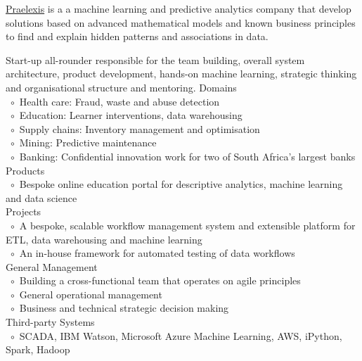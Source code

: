 \documentclass[10pt,a4paper,final]{columncv}
\newcommand{\cvitembullet}{~$\circ$~}
\newcommand{\cvitempbullet}{\phantom{\cvitembullet}}
\begin{document}
\pagebreak

\noindent \href{http://www.praelexis.com/}{Praelexis} is a a machine learning and predictive 
analytics company that develop solutions based on advanced mathematical models and known 
business principles to find and explain hidden patterns and associations in data. 

\begin{cvenv}
         {Start-up all-rounder responsible for the team building, overall system architecture,  
         product development, hands-on machine learning, strategic thinking and organisational
	       structure and mentoring.}
         {Domains \\ 
          \cvitembullet Health care: Fraud, waste and abuse detection \\
          \cvitembullet Education: Learner interventions, data warehousing \\
          \cvitembullet Supply chains: Inventory management and optimisation \\
          \cvitembullet Mining: Predictive maintenance \\
          \cvitembullet Banking: Confidential innovation work for two of South Africa's 
          \cvitempbullet largest banks \\
          Products \\
          \cvitembullet Bespoke online education portal for descriptive analytics,  
          \cvitempbullet machine learning and data science \\
          Projects \\
          \cvitembullet A bespoke, scalable workflow management system and extensible 
          \cvitempbullet platform for ETL, data warehousing and machine learning \\
          \cvitembullet An in-house framework for automated testing of data workflows \\
          General Management \\
          \cvitembullet Building a cross-functional team that operates on agile principles \\
          \cvitembullet General operational management \\
          \cvitembullet Business and technical strategic decision making \\
          Third-party Systems \\
          \cvitembullet SCADA, IBM Watson, Microsoft Azure Machine Learning, AWS,
          \cvitempbullet iPython, Spark, Hadoop
          }
\end{cvenv}
\end{document}
